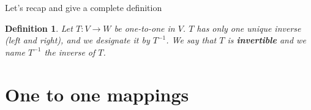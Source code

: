 \documentclass{book}
\newtheorem{definition}{Definition}[section]
\begin{document}
Let's recap and give a complete definition

\begin{definition}
    Let $T:V \to W$ be one-to-one in $V$. $T$ has only one unique inverse (left and right), and
    we designate it by $T^{-1}$. We say that $T$ is \textbf{invertible} and we name $T^{-1}$ the
    inverse of $T$.
\end{definition}

\section{One to one mappings}
\end{document}
